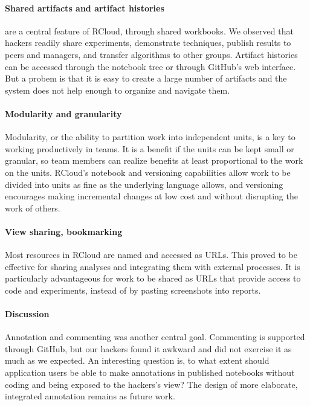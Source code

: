 \paragraph*{Shared artifacts and artifact histories} are a central feature
of RCloud, through shared workbooks. We observed that hackers readily
share experiments, demonstrate techniques, publish results to peers and
managers, and transfer algorithms to other groups. Artifact histories
can be accessed through the notebook tree or through GitHub's web interface.
But a probem is that it is easy to create a large number of artifacts
and the system does not help enough to organize and navigate them.

\paragraph*{Modularity and granularity} Modularity, or the ability
to partition work into independent units, is a key to working
productively in teams.
It is a benefit if the units can be kept small or granular, so team members
can realize benefits at least proportional to the work on the units.
RCloud's notebook and versioning capabilities allow work to be divided
into units as fine as the underlying language allows, and versioning
encourages making incremental changes at low cost and without disrupting
the work of others.

\paragraph*{View sharing, bookmarking} Most resources in RCloud are named
and accessed as URLs. This proved to be effective for sharing analyses
and integrating them with external processes.  It is particularly
advantageous for work to be shared as URLs that provide access to code
and experiments, instead of by pasting screenshots into reports.

\paragraph*{Discussion} Annotation and commenting was another central goal.
Commenting is supported through GitHub, but our hackers found it
awkward and did not exercise it as much as we expected.
An interesting question is, to what extent should application users
be able to make annotations in published notebooks without coding
and being exposed to the hackers's view? The design of
more elaborate, integrated annotation remains as future work.

